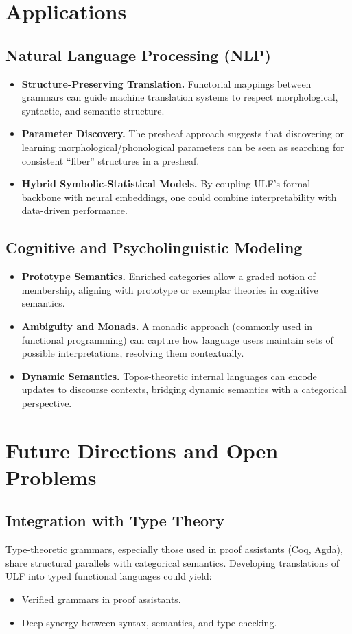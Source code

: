 \documentclass[12pt]{article}
\theoremstyle{plain}
\theoremstyle{definition}
\begin{document}
\section{Applications}
\subsection{Natural Language Processing (NLP)}
\begin{itemize}
    \item \textbf{Structure-Preserving Translation.} Functorial mappings between grammars can guide machine translation systems to respect morphological, syntactic, and semantic structure. 
    \item \textbf{Parameter Discovery.} The presheaf approach suggests that discovering or learning morphological/phonological parameters can be seen as searching for consistent “fiber” structures in a presheaf. 
    \item \textbf{Hybrid Symbolic-Statistical Models.} By coupling ULF’s formal backbone with neural embeddings, one could combine interpretability with data-driven performance.
\end{itemize}

\subsection{Cognitive and Psycholinguistic Modeling}
\begin{itemize}
    \item \textbf{Prototype Semantics.} Enriched categories allow a graded notion of membership, aligning with prototype or exemplar theories in cognitive semantics.
    \item \textbf{Ambiguity and Monads.} A monadic approach (commonly used in functional programming) can capture how language users maintain sets of possible interpretations, resolving them contextually.
    \item \textbf{Dynamic Semantics.} Topos-theoretic internal languages can encode updates to discourse contexts, bridging dynamic semantics with a categorical perspective.
\end{itemize}

\section{Future Directions and Open Problems}
\subsection{Integration with Type Theory}
Type-theoretic grammars, especially those used in proof assistants (Coq, Agda), share structural parallels with categorical semantics. Developing translations of ULF into typed functional languages could yield:
\begin{itemize}
    \item Verified grammars in proof assistants.
    \item Deep synergy between syntax, semantics, and type-checking.
\end{itemize}
\end{document}
